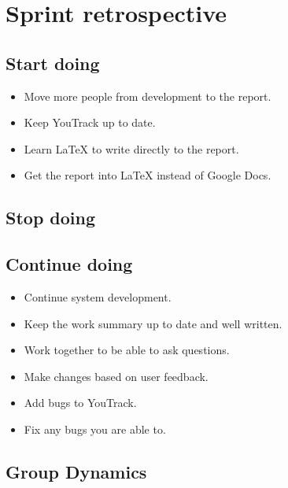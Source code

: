 \section{Sprint retrospective}
\label{sec:S4Retrospective}


\subsection{Start doing}
\label{subsec:S4RetrospectiveStart}

\begin{itemize}
   \item Move more people from development to the report.
   \item Keep YouTrack up to date.
   \item Learn LaTeX to write directly to the report.
   \item Get the report into LaTeX instead of Google Docs.
\end{itemize}

\subsection{Stop doing}
\label{subsec:S4RetrospectiveStop}

\subsection{Continue doing}
\label{subsec:S4RetrospectiveContinue}

\begin{itemize}
    \item Continue system development.
    \item Keep the work summary up to date and well written.
    \item Work together to be able to ask questions.
    \item Make changes based on user feedback.
    \item Add bugs to YouTrack.
    \item Fix any bugs you are able to.
\end{itemize}

\subsection{Group Dynamics}
\label{subsec:S4RetrospectiveGroupDynamics}

